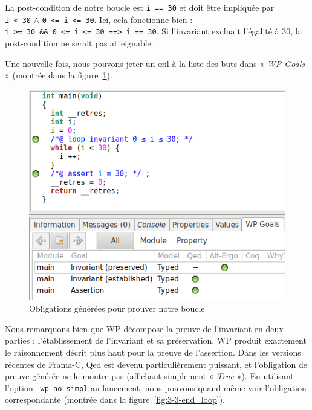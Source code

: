 \documentclass[12pt,francais,]{scrbook}
\begin{document}
La post-condition de notre boucle est \texttt{i\ ==\ 30} et doit être
impliquée par \(\neg\) \texttt{i\ \textless{}\ 30} \(\wedge\)
\texttt{0\ \textless{}=\ i\ \textless{}=\ 30}. Ici, cela fonctionne bien
:
\texttt{i\ \textgreater{}=\ 30\ \&\&\ 0\ \textless{}=\ i\ \textless{}=\ 30\ ==\textgreater{}\ i\ ==\ 30}.
Si l'invariant excluait l'égalité à 30, la post-condition ne serait pas
atteignable.

Une nouvelle fois, nous pouvons jeter un œil à la liste des buts dans «
\emph{WP Goals} » (montrée dans la figure~\ref{fig:3-3-1-i_30-1}).

\begin{figure}[htbp]
\centering
\includegraphics[scale=0.5]{3-3-1-i_30-1.png}
\caption{Obligations générées pour prouver notre boucle}
\label{fig:3-3-1-i_30-1}
\end{figure}

Nous remarquons bien que WP décompose la preuve de l'invariant en deux
parties : l'établissement de l'invariant et sa préservation. WP produit
exactement le raisonnement décrit plus haut pour la preuve de
l'assertion. Dans les versions récentes de Frama-C, Qed est devenu
particulièrement puissant, et l'obligation de preuve générée ne le
montre pas (affichant simplement « \emph{True} »). En utilisant l'option
\texttt{-wp-no-simpl} au lancement, nous pouvons quand même voir
l'obligation correspondante (montrée dans la figure~\ref{fig:3-3-end_loop}).
\end{document}
